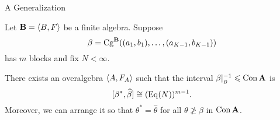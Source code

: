 \begin{frame}[fragile,label=OAextension2,shrink=5]{A Generalization}

\begin{theorem}
Let $\mathbf{B} = \langle B, F\rangle$ be a finite algebra. Suppose
\[
\beta = \mathrm{Cg}^{\mathbf{B}}((a_1, b_1), \dots, (a_{K-1},b_{K-1}))
\]
has $m$ blocks and fix $N<\infty$.

\vskip3mm

There exists an overalgebra $\langle A, F_A\rangle$
such that the interval $\beta|_{_B}^{-1} \leqslant \mathrm{Con\,} \mathbf{A}$ is 
\[
[\beta^*, \widehat{\beta}] \cong (\mathrm{Eq} (N))^{m-1}.
\]
Moreover, we can arrange it so that $\theta^* = \widehat{\theta}$ for all $\theta \ngeq \beta$ in $\mathrm{Con\,} \mathbf{A}$.
\end{theorem}




\end{frame}
